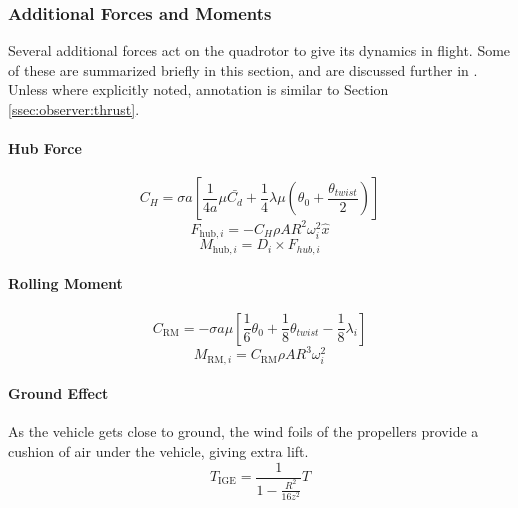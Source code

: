 \subsubsection{Additional Forces and Moments}
\label{ssec:observer:additionalforces}
    Several additional forces act on the quadrotor to give its dynamics in flight.
    Some of these are summarized briefly in this section, and are discussed further in \citep{bouabdallah07full}.
    Unless where explicitly noted, annotation is similar to Section \ref{ssec:observer:thrust}.
    \paragraph{Hub Force}
        \begin{equation}
            C_{H} = \sigma a \left[
                \frac{1}{4a}\mu\bar{C_{d}}
                + \frac{1}{4}\lambda\mu\left( \theta_{0} + \frac{\theta_{twist}}{2} \right)
                \right]
        \end{equation}
        \begin{equation}
            F_{\text{hub},i} = -C_{H} \rho A R^{2} \omega_{i}^{2}\hat{x}
        \end{equation}
        \begin{equation}
            M_{\text{hub},i} = D_{i} \times F_{hub,i}
        \end{equation}

    \paragraph{Rolling Moment}
        \begin{equation}
            C_{\text{RM}} = - \sigma a \mu \left[
                \frac{1}{6}\theta_{0}
                + \frac{1}{8}\theta_{twist}
                - \frac{1}{8}\lambda_{i}
                \right]
        \end{equation}
        \begin{equation}
            M_{\text{RM},i} = C_{\text{RM}} \rho A R^{3} \omega_{i}^{2}
        \end{equation}

    \paragraph{Ground Effect}
        As the vehicle gets close to ground, the wind foils of the propellers
        provide a cushion of air under the vehicle, giving extra lift.
        \begin{equation}
            T_{\text{IGE}} = \frac{1}{1-\frac{R^{2}}{16z^{2}}} T
        \end{equation}

